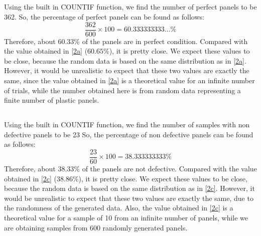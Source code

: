 \documentclass[letterpaper]{article}
\begin{document}
\subsection{}%
Using the built in COUNTIF function, we find the number of perfect panels to be
362. So, the percentage of perfect panels can be found as follows:
$$\frac{362}{600}\times 100 = 60.333333333...\%$$
Therefore, about $60.33\%$ of the panels are in perfect condition. Compared with
the value obtained in \ref{2a} ($60.65\%$), it is pretty close. We expect these
values to be close, because the random data is based on the same distribution as
in \ref{2a}. However, it would be unrealistic to expect that these two values
are exactly the same, since the value obtained in \ref{2a} is a theoretical
value for an infinite number of trials, while the number obtained here is from
random data representing a finite number of plastic panels.


\subsection{}%
Using the built in COUNTIF function, we find the number of samples with non
defective panels to be 23 So, the percentage of non defective panels can be
found as follows:
$$\frac{23}{60}\times 100 = 38.333333333\%$$
Therefore, about $38.33\%$ of the panels are not defective. Compared with the
value obtained in \ref{2c} ($38.86\%$), it is pretty close. We expect these
values to be close, because the random data is based on the same distribution as
in \ref{2c}. However, it would be unrealistic to expect that these two values
are exactly the same, due to the randomness of the generated data. Also, the
value obtained in \ref{2c} is a theoretical value for a sample of 10 from an
infinite number of panels, while we are obtaining samples from 600 randomly
generated panels.

\subsection{}%
\end{document}
